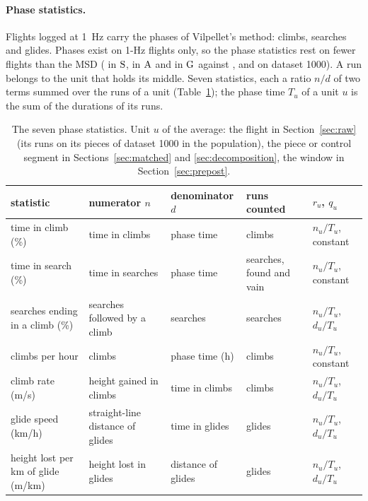 \paragraph{Phase statistics.} Flights logged at 1~Hz carry the phases of Vilpellet's method: climbs, searches and glides.
Phases exist on 1-Hz flights only, so the phase statistics rest on fewer flights than the MSD
(\RawPhaseFlightsS{} in $\mathrm{S}$, \RawPhaseFlightsA{} in $\mathrm{A}$ and \RawPhaseFlightsG{} in $\mathrm{G}$ against \RawFlightsOneS, \RawFlightsOneA{} and \RawFlightsOneG{} on dataset 1000).
A run belongs to the unit that holds its middle. Seven statistics, each a ratio $n/d$ of two terms summed over the runs of a unit
(Table~\ref{tab:stats}); the phase time $T_u$ of a unit $u$ is the sum of the durations of its runs.

\begin{table}
\centering\footnotesize
\setlength{\tabcolsep}{3pt}
\begin{tabular}{@{}l l l l l@{}}
\toprule
statistic & numerator $n$ & denominator $d$ & runs counted & $r_u$, $q_u$ \\
\midrule
time in climb (\%) & time in climbs & phase time & climbs & $n_u/T_u$, constant \\
time in search (\%) & time in searches & phase time & searches, found and vain & $n_u/T_u$, constant \\
searches ending in a climb (\%) & searches followed by a climb & searches & searches & $n_u/T_u$, $d_u/T_u$ \\
climbs per hour & climbs & phase time (h) & climbs & $n_u/T_u$, constant \\
climb rate (m/s) & height gained in climbs & time in climbs & climbs & $n_u/T_u$, $d_u/T_u$ \\
glide speed (km/h) & straight-line distance of glides & time in glides & glides & $n_u/T_u$, $d_u/T_u$ \\
height lost per km of glide (m/km) & height lost in glides & distance of glides & glides & $n_u/T_u$, $d_u/T_u$ \\
\bottomrule
\end{tabular}
\caption{The seven phase statistics. Unit $u$ of the average: the flight in Section~\ref{sec:raw} (its runs on its pieces of dataset 1000
in the population), the piece or control segment in Sections~\ref{sec:matched} and \ref{sec:decomposition}, the window in Section~\ref{sec:prepost}.}
\label{tab:stats}
\end{table}

